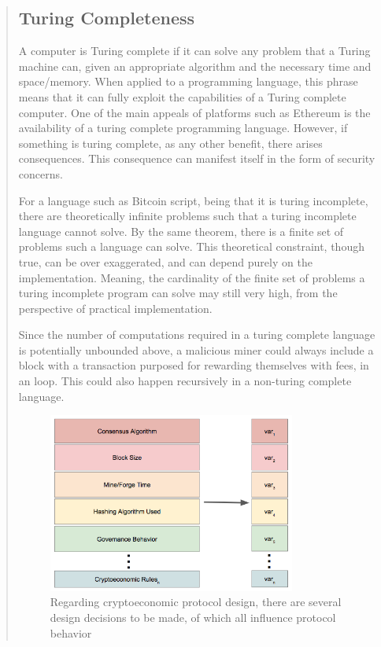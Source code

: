 \documentclass[12pt, titlepage, twocolumn]{report}
\begin{document}
\begin{quotation}
\subsection{Turing Completeness}
A computer is Turing complete if it can solve any problem that a Turing machine can, given an appropriate algorithm and the necessary time and space/memory. When applied to a programming language, this phrase means that it can fully exploit the capabilities of a Turing complete computer. One of the main appeals of platforms such as Ethereum is the availability of a turing complete programming language. However, if something is turing complete, as any other benefit, there arises consequences. This consequence can manifest itself in the form of security concerns. 

For a language such as Bitcoin script, being that it is turing incomplete, there are theoretically infinite problems such that a turing incomplete language cannot solve. By the same theorem, there is a finite set of problems such a language can solve. This theoretical constraint, though true, can be over exaggerated, and can depend purely on the implementation. Meaning, the cardinality of the finite set of problems a turing incomplete program can solve may still very high, from the perspective of practical implementation. 

Since the number of computations required in a turing complete language is potentially unbounded above, a malicious miner could always include a block with a transaction purposed for rewarding themselves with fees, in an loop. This could also happen recursively in a non-turing complete language.

\begin{figure}[ht]
\centering
	\includegraphics[width=0.8\textwidth]{reasons_modularity}
	\caption{Regarding cryptoeconomic protocol design, there are several design decisions to be made, of which all influence protocol behavior}
	\label{reasons_modularity}
\end{figure}


\end{quotation}
\end{document}
